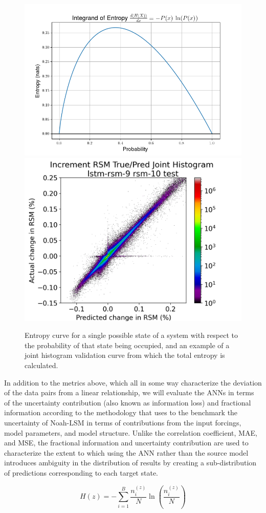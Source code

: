 \begin{figure}[h!]
    \centering
    \includegraphics[width=.54\linewidth,draft=false]{figures/entropy.png}
    \includegraphics[width=.44\linewidth,draft=false]{figures/validation-curves/eval_test_lstm-rsm-9_rsm-10_hist-true-pred_na.png}

    \caption{Entropy curve for a single possible state of a system with respect to the probability of that state being occupied, and an example of a joint histogram validation curve from which the total entropy is calculated.}
    \label{entropy}
\end{figure}

In addition to the metrics above, which all in some way characterize the deviation of the data pairs from a linear relationship, we will evaluate the ANNs in terms of the uncertainty contribution (also known as information loss) and fractional information according to the methodology that \citep{nearing_benchmarking_2016} uses to the benchmark the uncertainty of Noah-LSM in terms of contributions from the input forcings, model parameters, and model structure. Unlike the correlation coefficient, MAE, and MSE, the fractional information and uncertainty contribution are used to characterize the extent to which using the ANN rather than the source model introduces ambiguity in the distribution of results by creating a sub-distribution of predictions corresponding to each target state.

\begin{equation}\label{eq-entropy-h}
    H(z) = - \sum_{i=1}^B \frac{n^{(z)}_i}{N}\ln\left(\frac{n^{(z)}_i}{N}\right) %
\end{equation}

